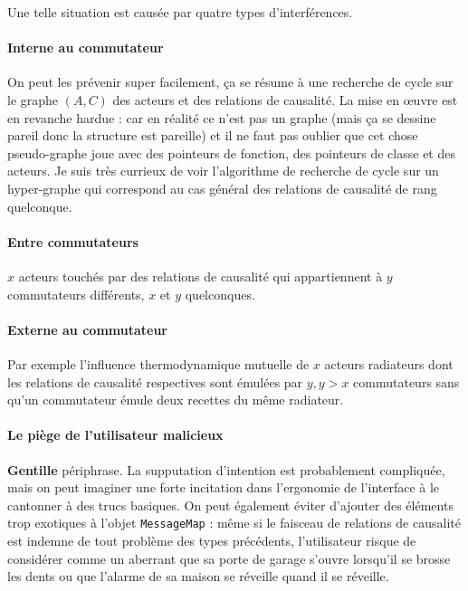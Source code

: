 \documentclass[11pt]{article}
\begin{document}
Une telle situation est causée par quatre types d'interférences.

\paragraph{Interne au commutateur} On peut les prévenir super facilement, ça se résume à une recherche de cycle sur le graphe $(A, C)$ des acteurs et des relations de causalité. La mise en œuvre est en revanche hardue : car en réalité ce n'est pas un graphe (mais ça se dessine pareil donc la structure est pareille) et il ne faut pas oublier que cet chose pseudo-graphe joue avec des pointeurs de fonction, des pointeurs de classe et des acteurs. Je suis très currieux de voir l'algorithme de recherche de cycle sur un hyper-graphe qui correspond au cas général des relations de causalité de rang quelconque.

\paragraph{Entre commutateurs} $x$ acteurs touchés par des relations de causalité qui appartiennent à $y$ commutateurs différents, $x$ et $y$ quelconques.

\paragraph{Externe au commutateur} Par exemple l'influence thermodynamique mutuelle de $x$ acteurs radiateurs dont les relations de causalité respectives sont émulées par $y, y > x$ commutateurs sans qu'un commutateur émule deux recettes du même radiateur.

\paragraph{Le piège de l'utilisateur malicieux} \textbf{Gentille} périphrase. La supputation d'intention est probablement compliquée, mais on peut imaginer une forte incitation dans l'ergonomie de l'interface à le cantonner à des trucs basiques. On peut également éviter d'ajouter des éléments trop exotiques à l'objet \texttt{MessageMap} : même si le faisceau de relations de causalité est indemne de tout problème des types précédents, l'utilisateur risque de considérer comme un aberrant que sa porte de garage s'ouvre lorsqu'il se brosse les dents ou que l'alarme de sa maison se réveille quand il se réveille.

\end{document}
